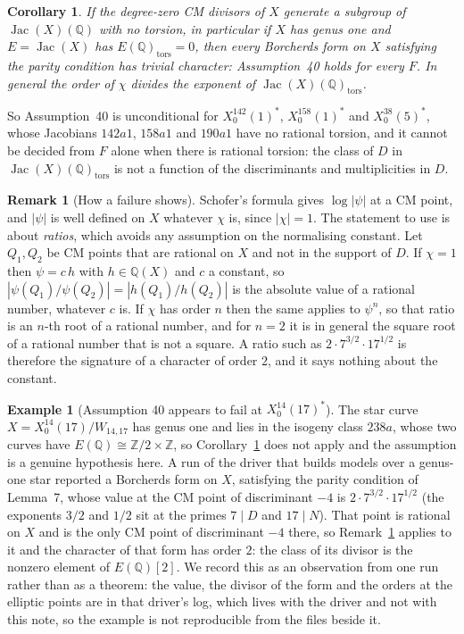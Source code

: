 \documentclass[11pt,reqno]{amsart}
\theoremstyle{plain}
\newtheorem{corollary}[theorem]{Corollary}
\theoremstyle{definition}
\newtheorem{remark}[theorem]{Remark}
\newtheorem{example}[theorem]{Example}
\DeclareMathOperator{\Jac}{Jac}
\newcommand{\Q}{\mathbb{Q}}
\newcommand{\Z}{\mathbb{Z}}
\begin{document}
\begin{corollary}\label{cor:torsionfree}
If the degree-zero CM divisors of $X$ generate a subgroup of $\Jac(X)(\Q)$ with no torsion, in
particular if $X$ has genus one and $E = \Jac(X)$ has $E(\Q)_{\mathrm{tors}} = 0$, then every
Borcherds form on $X$ satisfying the parity condition has trivial character: Assumption~40 holds
for every $F$. In general the order of $\chi$ divides the exponent of $\Jac(X)(\Q)_{\mathrm{tors}}$.
\end{corollary}

So Assumption~40 is unconditional for $X_0^{142}(1)^*$, $X_0^{158}(1)^*$ and $X_0^{38}(5)^*$, whose
Jacobians $142a1$, $158a1$ and $190a1$ have no rational torsion, and it cannot be decided from $F$
alone when there is rational torsion: the class of $D$ in $\Jac(X)(\Q)_{\mathrm{tors}}$ is not a
function of the discriminants and multiplicities in $D$.

\begin{remark}[How a failure shows]\label{rem:failure}
Schofer's formula gives $\log|\psi|$ at a CM point, and $|\psi|$ is well defined on $X$ whatever
$\chi$ is, since $|\chi| = 1$. The statement to use is about \emph{ratios}, which avoids any
assumption on the normalising constant. Let $Q_1, Q_2$ be CM points that are rational on $X$ and
not in the support of $D$. If $\chi = 1$ then $\psi = c\,h$ with $h \in \Q(X)$ and $c$ a constant,
so $|\psi(Q_1)/\psi(Q_2)| = |h(Q_1)/h(Q_2)|$ is the absolute value of a rational number, whatever
$c$ is. If $\chi$ has order $n$ then the same applies to $\psi^n$, so that ratio is an $n$-th root
of a rational number, and for $n = 2$ it is in general the square root of a rational number that is
not a square. A ratio such as $2\cdot 7^{3/2}\cdot 17^{1/2}$ is therefore the signature of a
character of order $2$, and it says nothing about the constant.
\end{remark}

\begin{example}[Assumption 40 appears to fail at $X_0^{14}(17)^*$]\label{ex:14-17}
The star curve $X = X_0^{14}(17)/W_{14,17}$ has genus one and lies in the isogeny class $238a$,
whose two curves have $E(\Q) \cong \Z/2 \times \Z$, so Corollary~\ref{cor:torsionfree} does not
apply and the assumption is a genuine hypothesis here. A run of the driver that builds models over a
genus-one star reported a Borcherds form on $X$, satisfying the parity condition of Lemma~7, whose
value at the CM point of discriminant $-4$ is $2\cdot 7^{3/2}\cdot 17^{1/2}$ (the exponents $3/2$ and
$1/2$ sit at the primes $7 \mid D$ and $17 \mid N$). That point is rational on $X$ and is the only CM
point of discriminant $-4$ there, so Remark~\ref{rem:failure} applies to it and the character of that
form has order $2$: the class of its divisor is the nonzero element of $E(\Q)[2]$. We record this as
an observation from one run rather than as a theorem: the value, the divisor of the form and the
orders at the elliptic points are in that driver's log, which lives with the driver and not with
this note, so the example is not reproducible from the files beside it.
\end{example}
\end{document}
